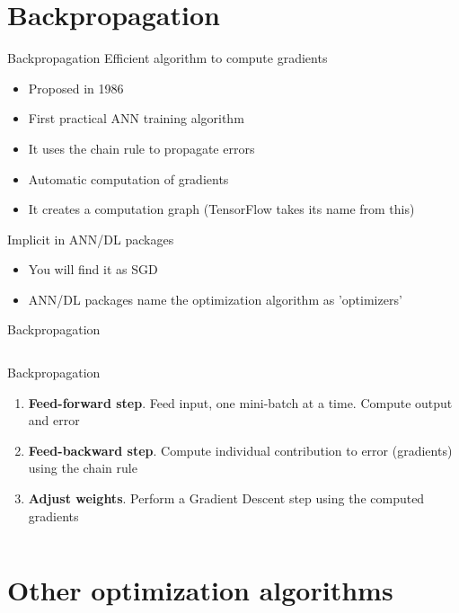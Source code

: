 \documentclass[10pt,compress]{beamer} %
\begin{document}
\section{Backpropagation}
\begin{frame}{Backpropagation}
	Efficient algorithm to compute gradients
        \begin{itemize}
		\item Proposed in 1986
		\item First practical ANN training algorithm
                \item It uses the chain rule to propagate errors
		\item Automatic computation of gradients
		\item It creates a computation graph (TensorFlow takes its name from this)
        \end{itemize}

	Implicit in ANN/DL packages
	\begin{itemize}
		\item You will find it as SGD
		\item ANN/DL packages name the optimization algorithm as 'optimizers'
	\end{itemize}
\end{frame}

\begin{frame}{Backpropagation}
	\begin{columns}
	\begin{block}{Backpropagation}
	\begin{enumerate}
	\item \textbf{Feed-forward step}. Feed input, one mini-batch at a time. Compute output and error
	\item \textbf{Feed-backward step}. Compute individual contribution to error (gradients) using the chain rule
	\item \textbf{Adjust weights}. Perform a Gradient Descent step using the computed gradients
	\end{enumerate}
	\end{block}

		\centering 
	\end{columns}
\end{frame}

\section{Other optimization algorithms}
\end{document}
